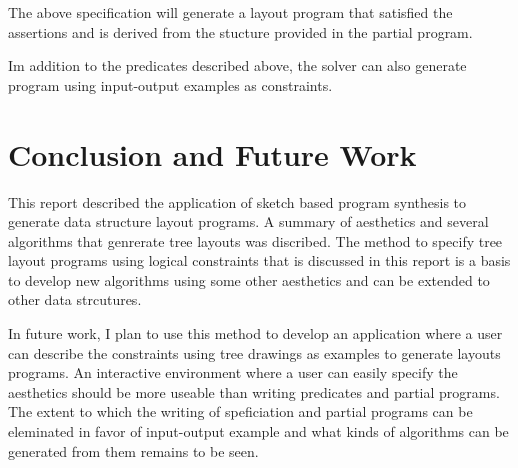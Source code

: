 \documentclass{article}
\begin{document}
The above specification will generate a layout program that satisfied
the assertions and is derived from the stucture provided in the
partial program.

Im addition to the predicates described above, the solver can also
generate program using input-output examples as constraints.

\section{Conclusion and Future Work}

This report described the application of sketch based program
synthesis to generate data structure layout programs.  A summary of
aesthetics and several algorithms that genrerate tree layouts was
discribed. The method to specify tree layout programs using logical
constraints that is discussed in this report is a basis to develop new
algorithms using some other aesthetics and can be extended to other
data strcutures.

In future work, I plan to use this method to develop an application
where a user can describe the constraints using tree drawings as
examples to generate layouts programs.  An interactive environment
where a user can easily specify the aesthetics should be more useable
than writing predicates and partial programs.  The extent to which the
writing of speficiation and partial programs can be eleminated in
favor of input-output example and what kinds of algorithms can be
generated from them remains to be seen.



\end{document}
